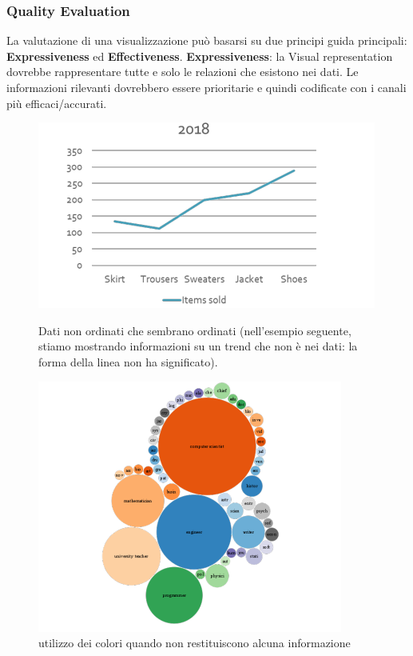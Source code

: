\subsubsection{Quality Evaluation}
La valutazione di una visualizzazione può basarsi su due principi 
guida principali: \textbf{Expressiveness} ed \textbf{Effectiveness}.
\textbf{Expressiveness}: la Visual representation dovrebbe rappresentare tutte e solo le relazioni che esistono nei dati.
Le informazioni rilevanti dovrebbero essere prioritarie e quindi codificate con i canali più efficaci/accurati.
\begin{figure}[H]
    \centering
    \begin{minipage}{0.45\textwidth}
        \centering
        \includegraphics[width=\linewidth]{images/ErroreEff.png} 
        \caption{Dati non ordinati che sembrano ordinati (nell'esempio seguente, stiamo mostrando informazioni su un trend che non è nei dati:
         la forma della linea non ha significato).}
        \label{fig:immagine1}
    \end{minipage}\hfill
    \begin{minipage}{0.45\textwidth}
        \centering
        \includegraphics[width=\linewidth]{images/ErroreEff2.png} %
        \caption{utilizzo dei colori quando non restituiscono alcuna informazione}
        \label{fig:immagine2}
    \end{minipage}
\end{figure}
